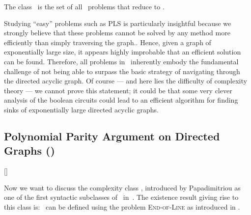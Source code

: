 \begin{definition}
    The class \PLS\ is the set of all \TFNP\ problems that reduce to \Localopt.
\end{definition}

Studying ``easy'' problems such as PLS is particularly insightful because we strongly believe that these problems cannot be solved by any method more efficiently than simply traversing the graph.. Hence, given a graph of exponentially large size, it appears highly improbable that an efficient solution can be found. Therefore, all problems in \PLS\ inherently embody the fundamental challenge of not being able to surpass the basic strategy of navigating through the directed acyclic graph. Of course --- and here lies the difficulty of complexity theory --- we cannot prove this statement; it could be that some very clever analysis of the boolean circuits could lead to an efficient algorithm for finding sinks of exponentially large directed acyclic graphs.

\subsection{Polynomial Parity Argument on Directed Graphs (\PPAD)}[\PPAD]

Now we want to discuss the complexity class \PPAD, introduced by Papadimitriou as one of the first syntactic subclasses of \TFNP\ in~. The existence result giving rise to this class is: 
\PPAD\ can be defined using the problem \textsc{End-of-Line} as introduced in .


